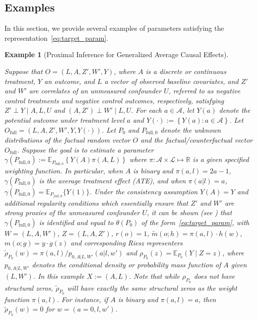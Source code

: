 \documentclass[twoside,11pt]{article}
\newtheorem{example}{Example}
\newcommand{\E}{\mathbb{E}}
\newcommand{\mc}{\mathcal}
\begin{document}
\subsection{Examples}\label{sec:examples}

In this section, we provide several examples of parameters satisfying the representation~\eqref{eq:target_param}.

\begin{example}[Proximal Inference for Generalized Average Causal Effects]\label{example_gace}

Suppose that $O=(L,A,Z',W',Y)$, where $A$ is a discrete or continuous treatment, $Y$ an outcome, and $L$ a vector of observed baseline covariates, and $Z'$ and $W'$ are correlates of an unmeasured confounder $U$, referred to as negative control treatments and negative control outcomes, respectively, satisfying $Z' \perp Y \mid A,L,U$ and  $(A,Z') \perp W' \mid L,U$. For each $a\in\mc{A}$, let $Y(a)$ denote the potential outcome under treatment level $a$ and $Y ( \cdot):= \left\{Y(a):a \in \mc{A} \right\}$. Let $O_{\text{full}}=(L,A,Z',W',Y, Y(\cdot))$. Let $P_0$ and $P_{\text{full},0}$ denote the unknown distributions of the factual random vector $O$ and the factual/counterfactual vector $O_{\text{full}}$. Suppose the goal is to estimate a parameter $\gamma(P_{\text{full},0}) := \mathbb{E}_{P_{\text{full},0}}\left\{ Y(A)\pi(A,L)\right\}$ where $\pi:\mc{A}\times\mc{L}\mapsto\mathbb{R}$ is a given specified weighting function. In particular, when $A$ is binary and $\pi(a,l) = 2a - 1$, $\gamma(P_{\text{full},0})$ is the average treatment effect (ATE), and when $\pi(a|l)=a$, $\gamma(P_{\text{full},0})=\E_{P_{full,0}}\{Y(1)\}$. Under the consistency assumption $Y(A)=Y$ and additional regularity conditions which essentially ensure that $Z'$ and $W'$ are strong proxies of the unmeasured confounder $U$, it can be shown (see \cite{miao2018identifying, tchetgen2020introduction, kallus2021causal, ghassami2022minimax, cui2024semiparametric}) that $\gamma(P_{\text{full},0})$ is identified and equal to $\theta(P_0)$ of the form~\eqref{eq:target_param}, with $W=(L,A,W')$, $Z=(L,A,Z')$, $
r(o) = 1$, $\tilde{m}(o;h) =\pi(a,l) \cdot h(w)$, $m(o;g) = y \cdot g(z)$
and corresponding Riesz representers $\tilde\rho_{P_0}(w) = \pi(a,l)/p_{0,A|L,W'}(a|l,w')$ and $\rho_{P_0}(z) = \mathbb{E}_{P_0}\left(Y \mid Z=z\right)$,
where $p_{0,A|L,W'}$ denotes the conditional density or probability mass function of $A$ given $(L,W')$. In this example $X:=(A,L)$. Note that while $\rho_{P_0}$ does not have structural zeros, $\tilde\rho_{P_0}$ will have exactly the same structural zeros as the weight function $\pi(a,l)$. For instance, if $A$ is binary and $\pi(a,l)=a$, then $\tilde\rho_{P_0}(w)=0$ for $w=(a=0,l,w')$. 
\end{example} 
\end{document}
